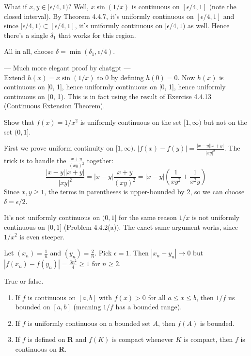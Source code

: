 \documentclass{oxmathproblems}
\begin{document}
\begin{questions}
\begin{solution}
\begin{enumerate}[label=(\alph*)]
    What if $x, y \in [\epsilon/4, 1)$? Well, $x \sin(1/x)$ is continuous on $[\epsilon/4, 1]$ (note the closed interval). By Theorem 4.4.7, it's uniformly continuous on $[\epsilon/4, 1]$ and since
    $[\epsilon/4, 1) \subset [\epsilon/4, 1]$, it's uniformly continuous on $[\epsilon/4, 1)$ as well. Hence there's a single $\delta_{1}$ that works for this region.

    All in all, choose $\delta = \min(\delta_{1}, \epsilon/4)$.
    
    --- Much more elegant proof by chatgpt ---\\
    Extend $h(x) = x \sin(1/x)$ to 0 by defining $h(0)=0$. Now $h(x)$ is continuous on [0, 1], hence uniformly continuous on [0, 1], hence uniformly continuous on (0, 1). This is in fact using the result
    of Exercise 4.4.13 (Continuous Extension Theorem).
  \end{enumerate}
\end{solution}

\miquestion Show that $f(x)=1/x^2$ is uniformly continuous on the set $[1, \infty)$ but not on the set $(0, 1]$.
\begin{solution}
  First we prove uniform continuity on $[1, \infty)$. $|f(x)-f(y)| = \frac{|x-y||x+y|}{|xy|^2}$. The trick is to handle the $\frac{x+y}{(xy)^2}$ together:
  \[\frac{|x-y||x+y|}{|xy|^2} = |x-y|\frac{x+y}{(xy)^2} = |x-y|\left(\frac{1}{xy^2} + \frac{1}{x^2y}\right)\]
  Since $x, y \geq 1$, the terms in parentheses is upper-bounded by 2, so we can choose $\delta=\epsilon/2$.

  It's not uniformly continuous on $(0, 1]$ for the same reason $1/x$ is not uniformly continuous on $(0, 1]$ (Problem 4.4.2(a)). The exact same argument works, since $1/x^2$ is even steeper.

  Let $(x_{n}) = \frac{1}{n}$ and $(y_{n}) = \frac{2}{n}$. Pick $\epsilon=1$. Then $|x_{n} - y_{n}| \to 0$ but $|f(x_{n})-f(y_{n})| = \frac{3n^2}{4} \geq 1$ for $n \geq 2$.
\end{solution}

\miquestion True or false.
\begin{enumerate}[label=(\alph*)]
  \item If $f$ is continuous on $[a, b]$ with $f(x) > 0$ for all $a \leq x \leq b$, then $1/f$ us bounded on $[a, b]$ (meaning $1/f$ has a bounded range).
  \item If $f$ is uniformly continuous on a bounded set $A$, then $f(A)$ is bounded.
  \item If $f$ is defined on \textbf{R} and $f(K)$ is compact whenever $K$ is compact, then $f$ is continuous on \textbf{R}.
\end{enumerate}


\end{questions}
\end{document}
